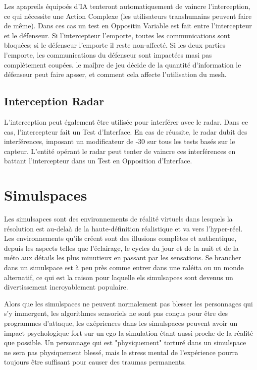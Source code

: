 Les apapreils équipoés d'IA tenteront automatiquement de vaincre l'interception, ce qui nécessite une Action Complexe (les utilisateurs transhumains peuvent faire de même). Dans ces cas un test en Oppositin Variable est fait entre l'intercepteur et le défenseur. Si l'intercepteur l'emporte, toutes les communications sont bloquées; si le défenseur l'emporte il reste non-affecté. Si les deux parties l'emporte, les communications du défenseur sont impactées masi pas complètement coupées. le maîþre de jeu décide de la quantité d'information le défenseur peut faire apsser, et comment cela affecte l'utilisation du mesh. 

\subsection{Interception Radar} 

L'interception peut également être utilisée pour interférer avec le radar. Dans ce cas, l'intercepteur fait un Test d'Interface. En cas de réussite, le radar dubit des interférences, imposant un modificateur de -30 sur tous les tests basés sur le capteur. L'entité opérant le radar peut tenter de vaincre ces interférences en battant l'intercepteur dans un Test en Opposition d'Interface. 

\section{Simulspaces} 

Les simulsapces sont des environnements de réalité virtuels dans lesquels la résolution est au-delaà de la haute-définition réalistique et va vers l'hyper-réel. Les environnements qu'ils créent sont des illusions complètes et authentique, depuis les aspects telles que l'éclairage, le cycles du jour et de la nuit et de la méto aux détails les plus minutieux en passant par les sensations. Se brancher dans un simulspace est à peu près comme entrer dans une raléita ou un monde alternatif, ce qui est la raison pour laquelle els simulsapces sont devenus un divertissement incroyablement populaire. 

Alors que les simulspaces ne peuvent normalement pas blesser les personnages qui s'y immergent, les algorithmes sensoriels ne sont pas conçus pour être des programmes d'attaque, les exépriences dans les simulspaces peuvent avoir un impact psychologique fort sur un ego la simulation étant aussi proche de la réalité que possible. Un personnage qui est "physiquement" torturé dans un simulspace ne sera pas physiquement blessé, mais le stress mental de l'expérience pourra toujours être suffisant pour causer des traumas permanents. 

